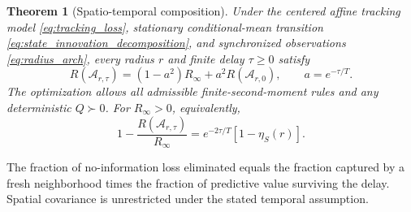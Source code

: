 \documentclass[11pt]{article}
\newtheorem{theorem}{Theorem}
\begin{document}
\begin{theorem}[Spatio-temporal composition]
\label{thm:spatiotemporal_composition}
Under the centered affine tracking model \eqref{eq:tracking_loss}, stationary
conditional-mean transition \eqref{eq:state_innovation_decomposition}, and
synchronized observations \eqref{eq:radius_arch}, every radius $r$ and finite
delay $\tau\ge0$ satisfy
\begin{equation}
\boxed{R(\mathcal A_{r,\tau})=(1-a^2)R_\infty+a^2R(\mathcal A_{r,0}),
\qquad a=e^{-\tau/T}.}
\label{eq:regret_composition_unnormalized}
\end{equation}
The optimization allows all admissible finite-second-moment rules and any
deterministic $Q\succ0$. For $R_\infty>0$, equivalently,
\begin{equation}
\boxed{1-\frac{R(\mathcal A_{r,\tau})}{R_\infty}
=e^{-2\tau/T}[1-\eta_S(r)].}
\label{eq:regret_composition_normalized}
\end{equation}
\end{theorem}
The fraction of no-information loss eliminated equals the fraction captured
by a fresh neighborhood times the fraction of predictive value surviving
the delay. Spatial covariance is unrestricted under the stated temporal
assumption.
\end{document}

